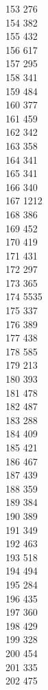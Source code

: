 { 153	276 \\
 154	382 \\
 155	432 \\
 156	617 \\
 157	295 \\
 158	341 \\
 159	484 \\
 160	377 \\
 161	459 \\
 162	342 \\
 163	358 \\
 164	341 \\
 165	341 \\
 166	340 \\
 167	1212 \\
 168	386 \\
 169	452 \\
 170	419 \\
 171	431 \\
 172	297 \\
 173	365 \\
 174	5535 \\
 175	337 \\
 176	389 \\
 177	438 \\
 178	585 \\
 179	213 \\
 180	393 \\
 181	478 \\
 182	487 \\
 183	288 \\
 184	409 \\
 185	421 \\
 186	467 \\
 187	439 \\
 188	359 \\
 189	384 \\
 190	389 \\
 191	349 \\
 192	463 \\
 193	518 \\
 194	494 \\
 195	284 \\
 196	435 \\
 197	360 \\
 198	429 \\
 199	328 \\
 200	454 \\
 201	335 \\
 202	475 \\
}
